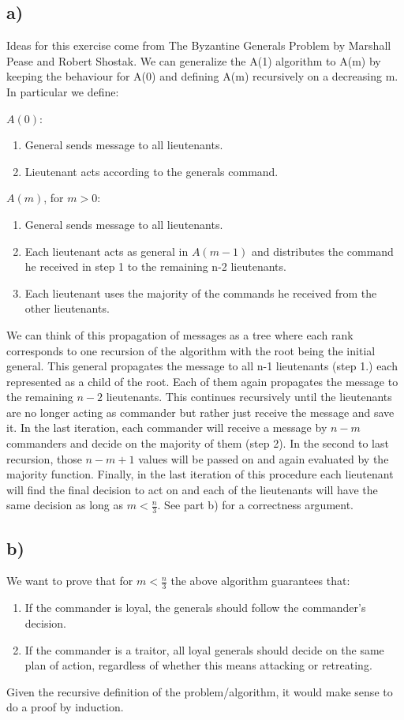 \documentclass[12pt]{article}
\begin{document}
\subsection*{a)}
Ideas for this exercise come from The Byzantine Generals Problem by Marshall Pease and Robert Shostak.
We can generalize the A(1) algorithm to A(m) by keeping the behaviour for A(0) and defining A(m) recursively on a decreasing m. In particular we define:

$A(0)$:
\begin{enumerate}
\item General sends message to all lieutenants.
\item Lieutenant acts according to the generals command.
\end{enumerate}

$A(m)$, for $m>0$:
\begin{enumerate}
\item General sends message to all lieutenants.
\item Each lieutenant acts as general in $A(m-1)$ and distributes the command he received in step 1 to the remaining n-2 lieutenants.
\item Each lieutenant uses the majority of the commands he received from the other lieutenants.
\end{enumerate}
We can think of this propagation of messages as a tree where each rank corresponds to one recursion of the algorithm with the root being the initial general. This general propagates the message to all n-1 lieutenants (step 1.) each represented as a child of the root. Each of them again propagates the message to the remaining $n-2$ lieutenants. This continues recursively until the lieutenants are no longer acting as commander but rather just receive the message and save it. In the last iteration, each commander will receive a message by $n-m$ commanders and decide on the majority of them (step 2). In the second to last recursion, those $n-m+1$ values will be passed on and again evaluated by the majority function. Finally, in the last iteration of this procedure each lieutenant will find the final decision to act on and each of the lieutenants will have the same decision as long as $m < \frac{n}{3}$. See part b) for a correctness argument.

\subsection*{b)}
We want to prove that for $m < \frac{n}{3}$ the above algorithm guarantees that:
\begin{enumerate}
\item If the commander is loyal, the generals should follow the commander's decision.
\item If the commander is a traitor, all loyal generals should decide on the same plan of action, regardless of whether this means attacking or retreating.
\end{enumerate}
Given the recursive definition of the problem/algorithm, it would make sense to do a proof by induction.\\
\end{document}
